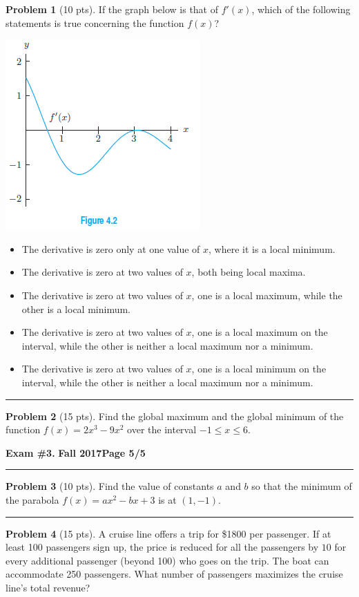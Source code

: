 \documentclass[12pt]{article}
\makeatletter
\theoremstyle{definition}
\newtheorem{problem}{Problem}
\newcommand*{\radiobutton}{%
  \@ifstar{\@radiobutton0}{\@radiobutton1}%
}
\newcommand*{\@radiobutton}[1]{%
  \begin{tikzpicture}
    \pgfmathsetlengthmacro\radius{height("X")/2}
    \draw[radius=\radius] circle;
    \ifcase#1 \fill[radius=.6*\radius] circle;\fi
  \end{tikzpicture}%
}
\makeatother
\begin{document}
\begin{problem}[10 pts]
If the graph below is that of $f'(x)$, which of the following statements is true concerning the function $f(x)$?
\begin{center}
\includegraphics{3graph2}
\end{center}
\begin{itemize}
\item[\radiobutton] The derivative is zero only at one value of $x$, where it is a local minimum.
\item[\radiobutton] The derivative is zero at two values of $x$, both being local maxima.
\item[\radiobutton] The derivative is zero at two values of $x$, one is a local maximum, while the other is a local minimum.
\item[\radiobutton] The derivative is zero at two values of $x$, one is a local maximum on the interval, while the other is neither a local maximum nor a minimum.
\item[\radiobutton] The derivative is zero at two values of $x$, one is a local minimum on the interval, while the other is neither a local maximum nor a minimum.
\end{itemize}
\end{problem}

\hrule
\begin{problem}[15 pts]
Find the global maximum and the global minimum of the function $f(x) = 2x^3 - 9x^2$ over the interval $-1 \leq x \leq 6$.
\end{problem}
\newpage

\hfill{\large\bf Exam \#3.}\hfill{\large\bf
  Fall 2017}\hfill{\large\bf Page 5/5}\hrule

\bigskip
\begin{problem}[10 pts]
Find the value of constants $a$ and $b$ so that the minimum of the parabola $f(x) = ax^2 -bx +3$ is at $(1,-1)$.

\vspace{7cm}
\end{problem}
\hrule
\begin{problem}[15 pts]
A cruise line offers a trip for \$1800 per passenger.  If at least 100 passengers sign up, the price is reduced for all the passengers by $10$ for every additional passenger (beyond 100) who goes on the trip.  The boat can accommodate 250 passengers.  What number of passengers maximizes the cruise line's total revenue?
\end{problem}
\end{document}

